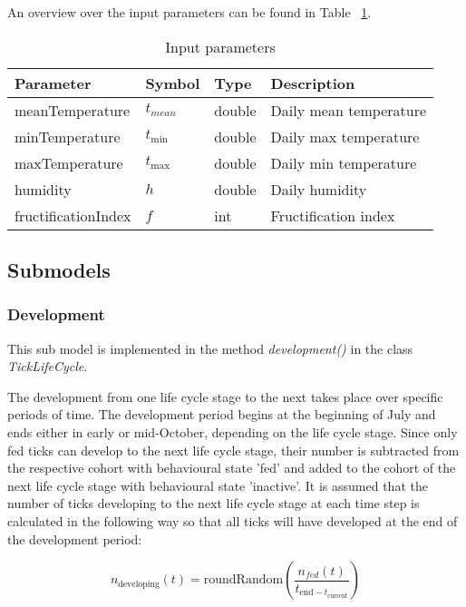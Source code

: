 \documentclass[a4paper, 11pt]{scrartcl}
\begin{document}
An overview over the input parameters can be found in Table ~\ref{input_parameters}.

\begin{table}[h!]
\caption{Input parameters}
\label{input_parameters}
\begin{tabularx}{\textwidth}{llll}
\toprule
\textbf{Parameter} & \textbf{Symbol} & \textbf{Type}     & \textbf{Description}       \\
\midrule
meanTemperature    & $t_{mean}$      & double            & Daily mean temperature     \\
minTemperature     & $t_{\min}$       & double            & Daily max temperature      \\
maxTemperature     & $t_{\max}$       & double            & Daily min temperature      \\
humidity           & $h$             & double            & Daily humidity             \\
\midrule
fructificationIndex & $f$            & int               & Fructification index       \\
\bottomrule
\end{tabularx}
\end{table}


\newpage
\subsection{Submodels}

\subsubsection{Development}
This sub model is implemented in the method \textit{development()} in the class \textit{TickLifeCycle}.

The development from one life cycle stage to the next takes place over specific periods of time. The development period begins at the beginning of July and ends either in early
or mid-October, depending on the life cycle stage. Since only fed ticks can develop to the next life cycle stage, their number is subtracted from the respective cohort with
behavioural state 'fed' and added to the cohort of the next life  cycle stage with behavioural state 'inactive'. It is assumed that the number of ticks developing to the next
life cycle stage at each time step is calculated in the following way so that all ticks will have developed at the end of the development period:

\begin{equation}
n_{\text{developing}}(t) = \text{roundRandom}(\frac{n_{fed}(t)}{t_{\text{end} - t_{\text{current}}}})
\end{equation}
\end{document}
